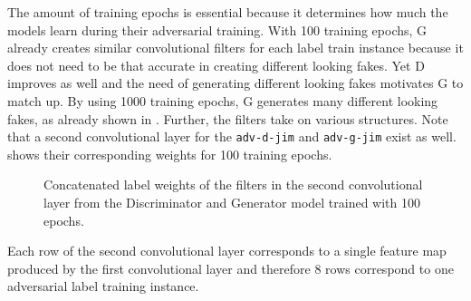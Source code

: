 \noindent
The amount of training epochs is essential because it determines how much the models learn during their adversarial training.
With 100 training epochs, G already creates similar convolutional filters for each label train instance because it does not need to be that accurate in creating different looking fakes.
Yet D improves as well and the need of generating different looking fakes motivates G to match up.
By using 1000 training epochs, G generates many different looking fakes, as already shown in .
Further, the filters take on various structures.
Note that a second convolutional layer for the \texttt{adv-d-jim} and \texttt{adv-g-jim} exist as well.
 shows their corresponding weights for 100 training epochs.
\begin{figure}[!ht]
  \centering
  \qquad \qquad
  \caption{Concatenated label weights of the filters in the second convolutional layer from the Discriminator and Generator model trained with 100 epochs.}
  \label{fig:nn_adv_label_weights_conv1}
\end{figure}
\FloatBarrier
\noindent
Each row of the second convolutional layer corresponds to a single feature map produced by the first convolutional layer and therefore 8 rows correspond to one adversarial label training instance.
